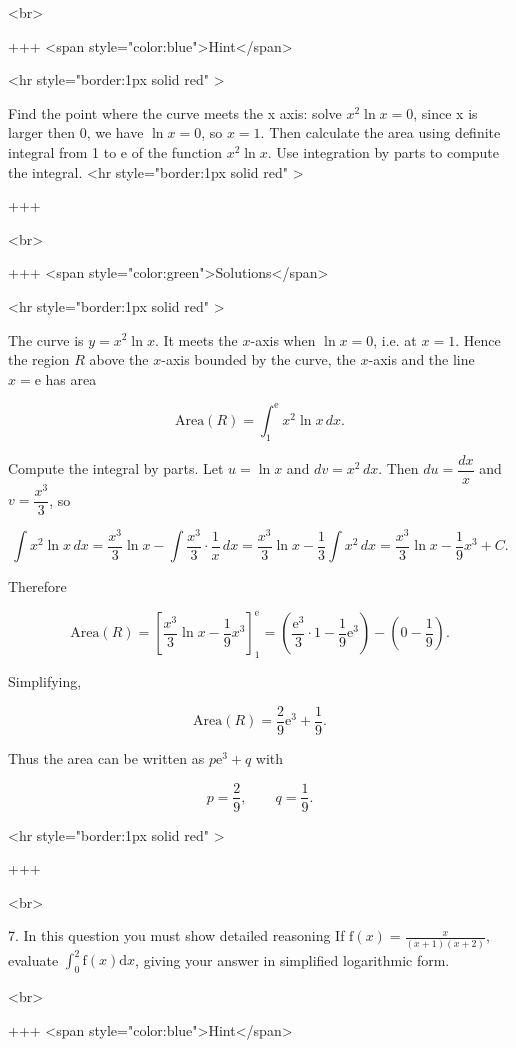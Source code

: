 <br>

+++ <span style="color:blue">Hint</span>

<hr style="border:1px solid red" >

Find the point where the curve meets the x axis: solve $x^{2}\ln x=0$, since x is larger then 0, we have $\ln x=0$, so $x=1$. Then calculate the area using definite integral from 1 to e of the function $x^{2}\ln x$. Use integration by parts to compute the integral.
<hr style="border:1px solid red" >

+++

<br>

+++ <span style="color:green">Solutions</span>

<hr style="border:1px solid red" >

The curve is $y=x^{2}\ln x$. It meets the $x$-axis when $\ln x=0$, i.e. at $x=1$. Hence the region $R$ above the $x$-axis bounded by the curve, the $x$-axis and the line $x=\mathrm{e}$ has area

$$
\text{Area}(R)=\int_{1}^{\mathrm{e}} x^{2}\ln x\,dx.
$$


Compute the integral by parts. Let $u=\ln x$ and $dv=x^{2}\,dx$. Then $du=\dfrac{dx}{x}$ and $v=\dfrac{x^{3}}{3}$, so

$$
\int x^{2}\ln x\,dx
= \frac{x^{3}}{3}\ln x-\int \frac{x^{3}}{3}\cdot\frac{1}{x}\,dx
= \frac{x^{3}}{3}\ln x-\frac{1}{3}\int x^{2}\,dx
= \frac{x^{3}}{3}\ln x-\frac{1}{9}x^{3}+C.
$$


Therefore

$$
\text{Area}(R)
=\left[\frac{x^{3}}{3}\ln x-\frac{1}{9}x^{3}\right]_{1}^{\mathrm{e}}
=\left(\frac{\mathrm{e}^{3}}{3}\cdot 1-\frac{1}{9}\mathrm{e}^{3}\right)
-\left(0-\frac{1}{9}\right).
$$

Simplifying,

$$
\text{Area}(R)=\frac{2}{9}\mathrm{e}^{3}+\frac{1}{9}.
$$


Thus the area can be written as $p\mathrm{e}^{3}+q$ with

$$
p=\frac{2}{9},\qquad q=\frac{1}{9}.
$$

<hr style="border:1px solid red" >

+++

<br>


7. In this question you must show detailed reasoning If $\mathrm{f}(x)=\frac{x}{(x+1)(x+2)}$, evaluate $\int_{0}^{2} \mathrm{f}(x) \mathrm{d} x$, giving your answer in simplified logarithmic form.

<br>

+++ <span style="color:blue">Hint</span>

